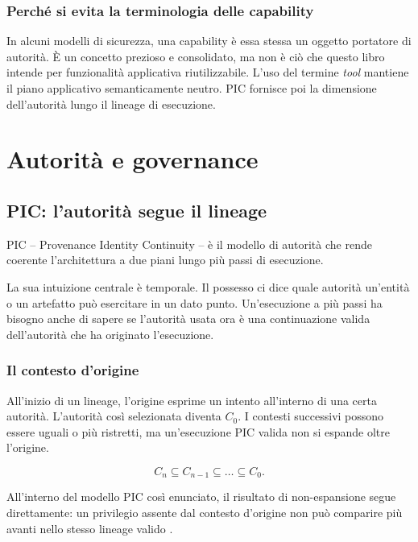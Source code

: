 \documentclass[10pt,oneside,openany]{book}
\begin{document}
\section{Perché si evita la terminologia delle capability}
In alcuni modelli di sicurezza, una capability è essa stessa un oggetto portatore di autorità. È un concetto prezioso e consolidato, ma non è ciò che questo libro intende per funzionalità applicativa riutilizzabile. L'uso del termine \emph{tool} mantiene il piano applicativo semanticamente neutro. PIC fornisce poi la dimensione dell'autorità lungo il lineage di esecuzione.

\part{Autorità e governance}

\chapter{PIC: l'autorità segue il lineage}

PIC -- Provenance Identity Continuity -- è il modello di autorità che rende coerente l'architettura a due piani lungo più passi di esecuzione.

La sua intuizione centrale è temporale. Il possesso ci dice quale autorità un'entità o un artefatto può esercitare in un dato punto. Un'esecuzione a più passi ha bisogno anche di sapere se l'autorità usata ora è una continuazione valida dell'autorità che ha originato l'esecuzione.

\section{Il contesto d'origine}
All'inizio di un lineage, l'origine esprime un intento all'interno di una certa autorità. L'autorità così selezionata diventa \(C_0\). I contesti successivi possono essere uguali o più ristretti, ma un'esecuzione PIC valida non si espande oltre l'origine.
\begin{formulabox}
\[
C_n \subseteq C_{n-1} \subseteq \dots \subseteq C_0.
\]
\end{formulabox}
All'interno del modello PIC così enunciato, il risultato di non-espansione segue direttamente: un privilegio assente dal contesto d'origine non può comparire più avanti nello stesso lineage valido \cite{gallo2026pic}.
\end{document}
